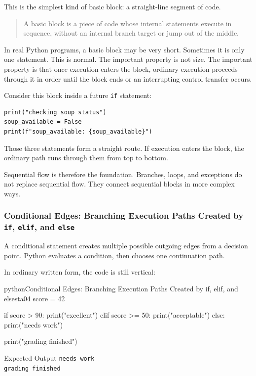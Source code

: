 This is the simplest kind of basic block: a straight-line segment of code.

\begin{quote}
A basic block is a piece of code whose internal statements execute in sequence, without an internal branch target or jump out of the middle.
\end{quote}

In real Python programs, a basic block may be very short. Sometimes it is only one statement. This is normal. The important property is not size. The important property is that once execution enters the block, ordinary execution proceeds through it in order until the block ends or an interrupting control transfer occurs.

Consider this block inside a future \texttt{if} statement:

\begin{verbatim}
print("checking soup status")
soup_available = False
print(f"soup_available: {soup_available}")
\end{verbatim}

Those three statements form a straight route. If execution enters the block, the ordinary path runs through them from top to bottom.

Sequential flow is therefore the foundation. Branches, loops, and exceptions do not replace sequential flow. They connect sequential blocks in more complex ways.

\subsubsection{Conditional Edges: Branching Execution Paths Created by \texttt{if}, \texttt{elif}, and \texttt{else}}

A conditional statement creates multiple possible outgoing edges from a decision point. Python evaluates a condition, then chooses one continuation path.

In ordinary written form, the code is still vertical:

\begin{codebox}[]{python}{Conditional Edges: Branching Execution Paths Created by if, elif, and else}{sta04}
score = 42

if score > 90:
    print("excellent")
elif score >= 50:
    print("acceptable")
else:
    print("needs work")

print("grading finished")
\end{codebox}


\begin{iobox}{Expected Output}
\texttt{needs work} \\
\texttt{grading finished} \\
\end{iobox}


